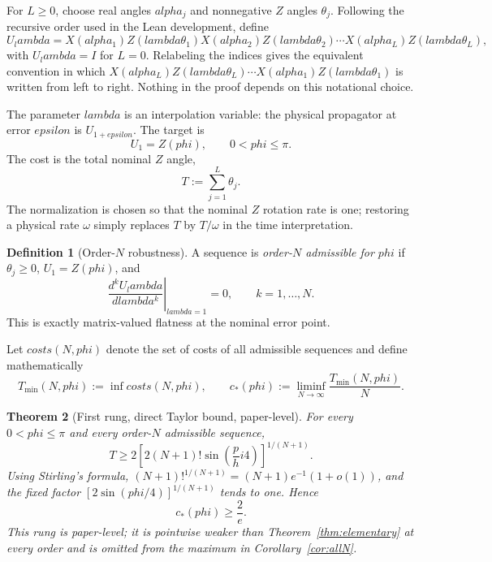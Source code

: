 \documentclass[%
  aps,
  pra,
  preprint,
  superscriptaddress,
  amsmath,amssymb,
  nofootinbib,
  floatfix,
]{revtex4-2}
\def\lambda{lambda}\def\tau{tau}\def\phi{phi}\def\alpha{alpha}%
\def\eps{epsilon}\def\C{C}\def\R{R}\def\lean#1{#1}\def\mathrm#1{#1}%
\newtheorem{theorem}{Theorem}
\theoremstyle{definition}
\newtheorem{definition}[theorem]{Definition}
\theoremstyle{remark}
\newcommand{\C}{\mathbb C}
\newcommand{\R}{\mathbb R}
\newcommand{\eps}{\varepsilon}
\newcommand{\cstar}{c_*}
\DeclareRobustCommand{\lean}[1]{\path{#1}}
\begin{document}
For $L\ge0$, choose real angles $\alpha_j$ and nonnegative $Z$ angles $\theta_j$. Following the
recursive order used in the Lean development, define
\begin{equation}
U_\lambda
= X(\alpha_1)Z(\lambda\theta_1)
  X(\alpha_2)Z(\lambda\theta_2)\cdots
  X(\alpha_L)Z(\lambda\theta_L),
\label{eq:sequence}
\end{equation}
with $U_\lambda=I$ for $L=0$. Relabeling the indices gives the equivalent convention in which
$X(\alpha_L)Z(\lambda\theta_L)\cdots X(\alpha_1)Z(\lambda\theta_1)$ is written from left to right.
Nothing in the proof depends on this notational choice.

The parameter $\lambda$ is an interpolation variable: the physical propagator at error $\eps$ is
$U_{1+\eps}$. The target is
\begin{equation}
U_1=Z(\phi),\qquad 0<\phi\le\pi.
\label{eq:target}
\end{equation}
The cost is the total nominal $Z$ angle,
\begin{equation}
T:=\sum_{j=1}^L\theta_j.
\label{eq:cost}
\end{equation}
The normalization is chosen so that the nominal $Z$ rotation rate is one; restoring a physical
rate $\omega$ simply replaces $T$ by $T/\omega$ in the time interpretation.

\begin{definition}[Order-$N$ robustness]
\label{def:admissible}
A sequence is \emph{order-$N$ admissible for $\phi$} if
$\theta_j\ge0$, $U_1=Z(\phi)$, and
\begin{equation}
\left.\frac{\mathrm{d}^k U_\lambda}{\mathrm{d}\lambda^k}\right|_{\lambda=1}=0,
\qquad k=1,\ldots,N.
\label{eq:robustness}
\end{equation}
This is exactly matrix-valued flatness at the nominal error point.
\end{definition}

Let $\mathrm{costs}(N,\phi)$ denote the set of costs of all admissible sequences and define
mathematically
\begin{equation}
T_{\min}(N,\phi):=\inf\mathrm{costs}(N,\phi),
\qquad
\cstar(\phi):=\liminf_{N\to\infty}\frac{T_{\min}(N,\phi)}{N}.
\label{eq:tmin}
\end{equation}

\begin{theorem}[First rung, direct Taylor bound, paper-level]
\label{thm:direct}
For every $0<\phi\le\pi$ and every order-$N$ admissible sequence,
\begin{equation}
\displaystyle
T\ge
2\left[2(N+1)!\sin\left(\frac\phi4\right)\right]^{1/(N+1)}.
\label{eq:2e-finite}
\end{equation}
Using Stirling's formula,
$(N+1)!^{1/(N+1)}=(N+1)\mathrm{e}^{-1}(1+o(1))$, and the fixed factor
$[2\sin(\phi/4)]^{1/(N+1)}$ tends to one. Hence
\begin{equation}
\cstar(\phi)\ge\frac{2}{\mathrm{e}}.
\label{eq:2e}
\end{equation}
This rung is paper-level; it is pointwise weaker than Theorem~\ref{thm:elementary} at every
order and is omitted from the maximum in Corollary~\ref{cor:allN}.
\end{theorem}
\end{document}
